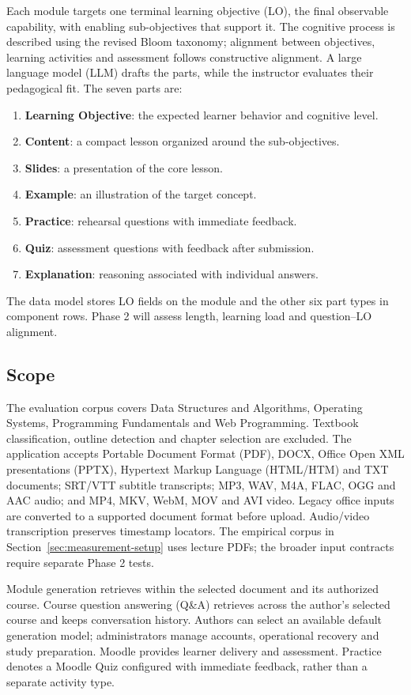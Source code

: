 Each module targets one terminal learning objective (LO), the final observable capability, with enabling sub-objectives that support it. The cognitive process is described using the revised Bloom taxonomy\citep{bloom}; alignment between objectives, learning activities and assessment follows constructive alignment\citep{alignment}. A large language model (LLM) drafts the parts, while the instructor evaluates their pedagogical fit. The seven parts are:
\begin{enumerate}[leftmargin=*]
\item \textbf{Learning Objective}: the expected learner behavior and cognitive level.
\item \textbf{Content}: a compact lesson organized around the sub-objectives.
\item \textbf{Slides}: a presentation of the core lesson.
\item \textbf{Example}: an illustration of the target concept.
\item \textbf{Practice}: rehearsal questions with immediate feedback.
\item \textbf{Quiz}: assessment questions with feedback after submission.
\item \textbf{Explanation}: reasoning associated with individual answers.
\end{enumerate}
The data model stores LO fields on the module and the other six part types in component rows. Phase 2 will assess length, learning load and question--LO alignment.
\subsection{Scope}\label{sec:scope}
The evaluation corpus covers Data Structures and Algorithms, Operating Systems, Programming Fundamentals and Web Programming. Textbook classification, outline detection and chapter selection are excluded. The application accepts Portable Document Format (PDF), DOCX, Office Open XML presentations (PPTX), Hypertext Markup Language (HTML/HTM) and TXT documents; SRT/VTT subtitle transcripts; MP3, WAV, M4A, FLAC, OGG and AAC audio; and MP4, MKV, WebM, MOV and AVI video. Legacy office inputs are converted to a supported document format before upload. Audio/video transcription preserves timestamp locators. The empirical corpus in Section~\ref{sec:measurement-setup} uses lecture PDFs; the broader input contracts require separate Phase 2 tests.

Module generation retrieves within the selected document and its authorized course. Course question answering (Q\&A) retrieves across the author's selected course and keeps conversation history. Authors can select an available default generation model; administrators manage accounts, operational recovery and study preparation. Moodle provides learner delivery and assessment. Practice denotes a Moodle Quiz configured with immediate feedback, rather than a separate activity type.
